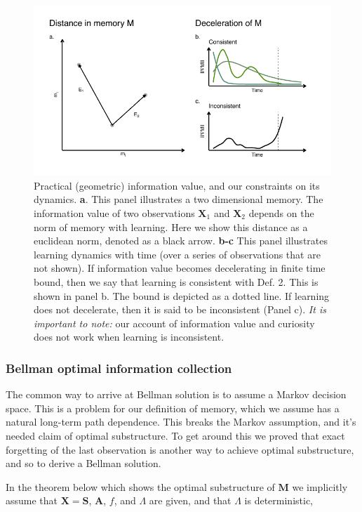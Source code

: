 \begin{figure}
	\includegraphics[width=1\linewidth]{img/cartoon.pdf} 
	\caption{Practical (geometric) information value, and our constraints on its dynamics. 
	\textbf{a}. This panel illustrates a two dimensional memory. The information value of two observations $\mathbf{X}_1$ and $\mathbf{X}_2$ depends on the norm of memory with learning. Here we show this distance as a euclidean norm, denoted as a black arrow.
	\textbf{b-c} This panel illustrates learning dynamics with time (over a series of observations that are not shown). If information value becomes decelerating in finite time bound, then we say that learning is consistent with Def. 2. This is shown in panel b. The bound is depicted as a dotted line. If learning does not decelerate, then it is said to be inconsistent (Panel c). \textit{It is important to note:} our account of information value and curiosity does not work when learning is inconsistent.
  	}
	\label{fig:cartoon} 
\end{figure}

\subsubsection*{Bellman optimal information collection}
The common way to arrive at Bellman solution is to assume a Markov decision space. This is a problem for our definition of memory, which we assume has a natural long-term path dependence. This breaks the Markov assumption, and it's needed claim of optimal substructure. To get around this we proved that exact forgetting of the last observation is another way to achieve optimal substructure, and so to derive a Bellman solution.

In the theorem below which shows the optimal substructure of $\mathbf{M}$ we implicitly assume that $\mathbf{X} = \mathbf{S}$, $\mathbf{A}$, $f$, and $\Lambda$ are given, and that $\Lambda$ is deterministic, 

